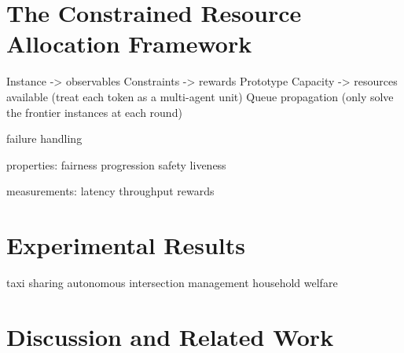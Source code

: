 \documentclass[conference]{IEEEtran}
\begin{document}
\section{The Constrained Resource Allocation Framework}
Instance -> observables
Constraints -> rewards
Prototype
Capacity -> resources available (treat each token as a multi-agent unit)
Queue propagation (only solve the frontier instances at each round)

failure handling


properties:
fairness
progression
safety
liveness

measurements:
latency
throughput
rewards

\section{Experimental Results}
taxi sharing
autonomous intersection management
household welfare

\section{Discussion and Related Work}




\end{document}
